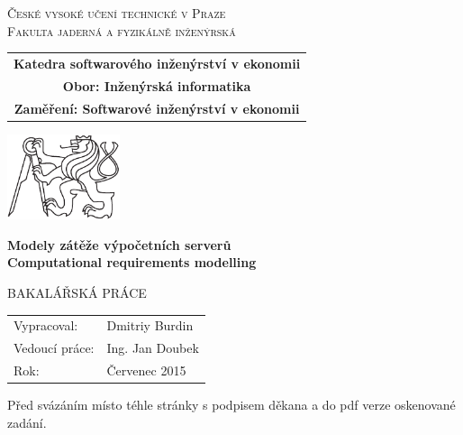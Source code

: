 \documentclass[a4paper,12pt,twoside]{scrreprt}
\newcommand{\cvut}{České vysoké učení technické v Praze}
\newcommand{\fjfi}{Fakulta jaderná a fyzikálně inženýrská}
\newcommand{\kse}{Katedra softwarového inženýrství v ekonomii}
\newcommand{\obor}{Inženýrská informatika}
\newcommand{\zamereni}{Softwarové inženýrství v ekonomii}
\newcommand{\nazevcz}{Modely zátěže výpočetních serverů}        %
\newcommand{\nazeven}{Computational requirements modelling}     %
\newcommand{\autor}{Dmitriy Burdin}           %
\newcommand{\rok}{Červenec 2015}          %
\newcommand{\vedouci}{Ing. Jan Doubek}         %
\newcommand{\druh}{BAKALÁŘSKÁ PRÁCE}
\begin{document}
\thispagestyle{empty}

\begin{center}
    {\Large \textsc{\cvut}\\[1.5ex] \textsc{\fjfi}}\\
    \vspace{10mm}

    \begin{tabular}{c}
	    {\bf \kse}\\   
      {\bf Obor: \obor}\\
      {\bf Zaměření: \zamereni}\\
    \end{tabular}

   \vspace{10mm} \includegraphics[height=25mm]{lev.pdf} \vspace{15mm}

   {\huge \bf \nazevcz}\\
   \vspace{5mm}   
   {\huge \bf \nazeven}
   
   \vspace{15mm}
   {\Large \druh}

   \vfill
   {\large
    \begin{tabular}{ll}
    Vypracoval: & \autor\\
    Vedoucí práce: & \vedouci\\
    Rok: & \rok
    \end{tabular}
   }
\end{center}

\newpage  %
\thispagestyle{empty} %

Před svázáním místo téhle stránky  s podpisem
děkana a do pdf verze oskenované zadání.
\end{document}

